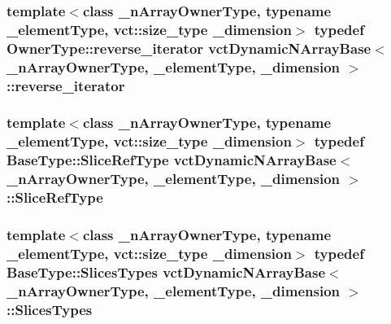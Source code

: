\subsubsection[{reverse\+\_\+iterator}]{\setlength{\rightskip}{0pt plus 5cm}template$<$class \+\_\+n\+Array\+Owner\+Type, typename \+\_\+element\+Type, vct\+::size\+\_\+type \+\_\+dimension$>$ typedef Owner\+Type\+::reverse\+\_\+iterator {\bf vct\+Dynamic\+N\+Array\+Base}$<$ \+\_\+n\+Array\+Owner\+Type, \+\_\+element\+Type, \+\_\+dimension $>$\+::{\bf reverse\+\_\+iterator}}\label{classvct_dynamic_n_array_base_a4a0adcb47fb464b8dd1a1e2495a52468}
\hypertarget{classvct_dynamic_n_array_base_aca69a8c3c62f1db0703198aa955d6157}{}
\subsubsection[{Slice\+Ref\+Type}]{\setlength{\rightskip}{0pt plus 5cm}template$<$class \+\_\+n\+Array\+Owner\+Type, typename \+\_\+element\+Type, vct\+::size\+\_\+type \+\_\+dimension$>$ typedef {\bf Base\+Type\+::\+Slice\+Ref\+Type} {\bf vct\+Dynamic\+N\+Array\+Base}$<$ \+\_\+n\+Array\+Owner\+Type, \+\_\+element\+Type, \+\_\+dimension $>$\+::{\bf Slice\+Ref\+Type}}\label{classvct_dynamic_n_array_base_aca69a8c3c62f1db0703198aa955d6157}
\hypertarget{classvct_dynamic_n_array_base_a4f034b6fdba4c573c4f5da7cb913fb54}{}
\subsubsection[{Slices\+Types}]{\setlength{\rightskip}{0pt plus 5cm}template$<$class \+\_\+n\+Array\+Owner\+Type, typename \+\_\+element\+Type, vct\+::size\+\_\+type \+\_\+dimension$>$ typedef {\bf Base\+Type\+::\+Slices\+Types} {\bf vct\+Dynamic\+N\+Array\+Base}$<$ \+\_\+n\+Array\+Owner\+Type, \+\_\+element\+Type, \+\_\+dimension $>$\+::{\bf Slices\+Types}}\label{classvct_dynamic_n_array_base_a4f034b6fdba4c573c4f5da7cb913fb54}
\hypertarget{classvct_dynamic_n_array_base_a473d1fefa0debae5d9f6b0cd3a05f269}{}
